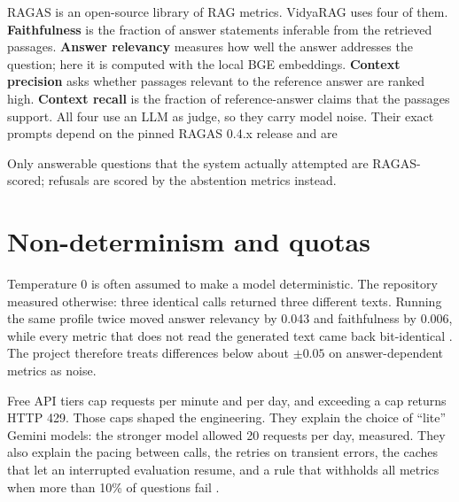 \begin{background}
RAGAS is an open-source library of RAG metrics. VidyaRAG uses four of them. \textbf{Faithfulness} is the fraction of answer statements inferable from the retrieved passages. \textbf{Answer relevancy} measures how well the answer addresses the question; here it is computed with the local BGE embeddings. \textbf{Context precision} asks whether passages relevant to the reference answer are ranked high. \textbf{Context recall} is the fraction of reference-answer claims that the passages support. All four use an LLM as judge, so they carry model noise. Their exact prompts depend on the pinned RAGAS 0.4.x release and are \NotDet
\end{background}

Only answerable questions that the system actually attempted are RAGAS-scored; refusals are scored by the abstention metrics instead.

\section{Non-determinism and quotas}

Temperature 0 is often assumed to make a model deterministic. The repository measured otherwise: three identical calls returned three different texts. Running the same profile twice moved answer relevancy by 0.043 and faithfulness by 0.006, while every metric that does not read the generated text came back bit-identical . The project therefore treats differences below about $\pm0.05$ on answer-dependent metrics as noise.

Free API tiers cap requests per minute and per day, and exceeding a cap returns HTTP 429. Those caps shaped the engineering. They explain the choice of ``lite'' Gemini models: the stronger model allowed 20 requests per day, measured. They also explain the pacing between calls, the retries on transient errors, the caches that let an interrupted evaluation resume, and a rule that withholds all metrics when more than 10\% of questions fail .

